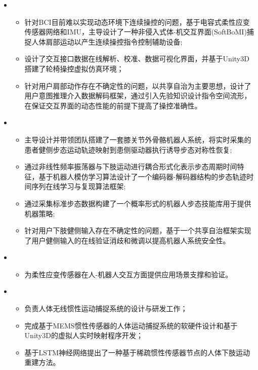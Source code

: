   \begin{itemize}[leftmargin=*]
    \item {}
    {\small
      \begin{itemize}
        \item 针对BCI目前难以实现动态环境下连续操控的问题，基于电容式柔性应变传感器网络和IMU，主导设计了一种非侵入式体-机交互界面(SoftBoMI)捕捉人体肩部运动以产生连续操控指令控制辅助设备;
        \item 设计了交互接口数据在线解析、校准、数据可视化界面，并基于Unity3D搭建了轮椅操控虚拟仿真环境；
        \item 针对用户肩部动作存在不确定性的问题，以共享自治为主要思想，设计了用户意图推理介入数据解码框架，通过引入先验知识设计指令空间流形，在保证交互界面的动态性能的前提下提高了操控准确性。
      \end{itemize}
    }

    \item {}
    {\small
    \begin{itemize}
      \item 主导设计并带领团队搭建了一套膝关节外骨骼机器人系统，将实时采集的患者健侧步态运动轨迹映射到患侧驱动器执行诱导步态对称性恢复;
      \item 通过非线性频率振荡器与下肢运动进行耦合形式化表示步态周期时间特征，基于机器人模仿学习算法设计了一个编码器-解码器结构的步态轨迹时间序列在线学习与复现算法框架;
      \item 通过采集标准步态数据构建了一个概率形式的机器人步态技能库用于提供机器策略;
      \item 针对用户下肢健侧输入存在不确定性的问题，基于一个共享自治框架实现了用户健侧输入的在线验证消歧和微调以提高机器人系统安全性。
    \end{itemize}
    }

    \item {}
    {\small
    \begin{itemize}
      \item 为柔性应变传感器在人-机器人交互方面提供应用场景支撑和验证。
    \end{itemize}
    }

    \item {}
    {\small
    \begin{itemize}
      \item 负责人体无线惯性运动捕捉系统的设计与研发工作；
      \item 完成基于MEMS惯性传感器的人体运动捕捉系统的软硬件设计和基于Unity3D的虚拟人实时映射程序开发；
      \item 基于LSTM神经网络提出了一种基于稀疏惯性传感器节点的人体下肢运动重建方法。
    \end{itemize}
    }


\end{itemize}
